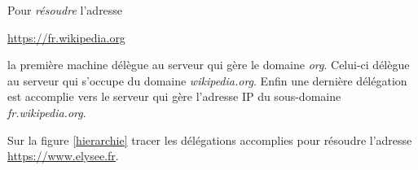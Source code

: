 \documentclass[a4paper,11pt]{article}
\begin{document}
\begin{Form}
Pour \emph{résoudre} l'adresse
\begin{center}
\url{https://fr.wikipedia.org}
\end{center}
la première machine délègue au serveur qui gère le domaine \emph{org}. Celui-ci délègue au serveur qui s'occupe du domaine \emph{wikipedia.org}. Enfin une dernière délégation est accomplie vers le serveur qui gère l'adresse IP du sous-domaine \emph{fr.wikipedia.org}.
\begin{activite}
Sur la figure \ref{hierarchie} tracer les délégations accomplies pour résoudre l'adresse \url{https://www.elysee.fr}.
\end{activite}
\end{Form}
\end{document}
